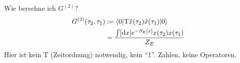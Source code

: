 Wie berechne ich $G^{(2)}$? 
	\begin{align*}
		G^{(2)} (\tau_2, \tau_1) &\coloneqq 
		\braket{0 | \mathrm{T} \hat{x}(\tau_2) \hat{x}(\tau_1) | 0} \\ 
		&= \frac{\int [\mathrm{d} x] e^{-S_E[x]} x(\tau_2) x(\tau_1)}{Z_E}
	\end{align*}
Hier ist kein T (Zeitordnung) notwendig, kein ``1''. Zahlen, keine Operatoren. 
